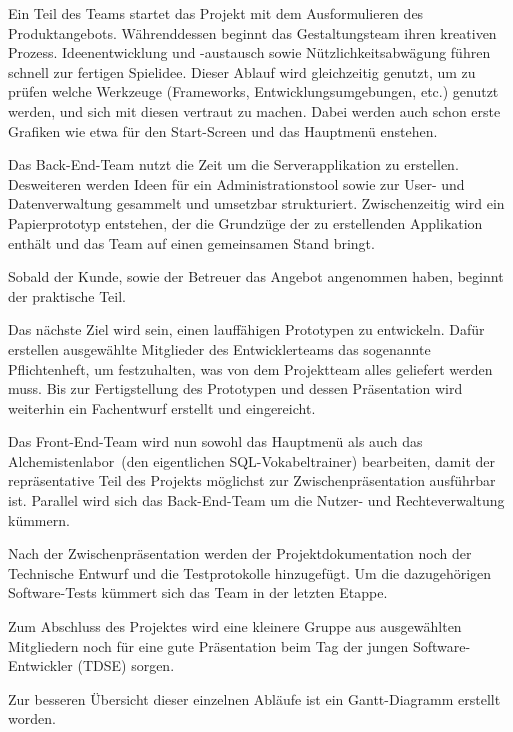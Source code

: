 Ein Teil des Teams startet das Projekt mit dem Ausformulieren des Produktangebots. W\"ahrenddessen beginnt das Gestaltungsteam ihren kreativen Prozess.
Ideenentwicklung und -austausch sowie N\"utzlichkeitsabw\"agung f\"uhren schnell zur fertigen Spielidee. Dieser Ablauf wird gleichzeitig genutzt, um zu pr\"ufen welche 
Werkzeuge (Frameworks, Entwicklungsumgebungen, etc.) genutzt werden, und sich mit diesen vertraut zu machen. Dabei werden auch schon erste Grafiken wie etwa 
f\"ur den Start-Screen und das Hauptmen\"u enstehen.

Das Back-End-Team nutzt die Zeit um die Serverapplikation zu erstellen. Desweiteren werden Ideen f\"ur ein Administrationstool sowie zur User- und Datenverwaltung 
gesammelt und umsetzbar strukturiert. Zwischenzeitig wird ein Papierprototyp entstehen, der die Grundz\"uge der zu erstellenden Applikation enth\"alt und das Team auf
einen gemeinsamen Stand bringt.

Sobald der Kunde, sowie der Betreuer das Angebot angenommen haben, beginnt der praktische Teil.

Das n\"achste Ziel wird sein, einen lauff\"ahigen Prototypen zu entwickeln.
Daf\"ur erstellen ausgew\"ahlte Mitglieder des Entwicklerteams das sogenannte Pflichtenheft, um festzuhalten, was von dem Projektteam alles geliefert werden muss.
Bis zur Fertigstellung des Prototypen und dessen Pr\"asentation wird weiterhin ein Fachentwurf erstellt und eingereicht.

Das Front-End-Team wird nun sowohl das Hauptmen\"u als auch das \glqq Alchemistenlabor\grqq~(den eigentlichen \glqq SQL-Vokabeltrainer\grqq) bearbeiten, damit der repr\"asentative 
Teil des Projekts m\"oglichst zur Zwischenpr\"asentation ausf\"uhrbar ist.
Parallel wird sich das Back-End-Team um die Nutzer- und Rechteverwaltung k\"ummern. 

Nach der Zwischenpr\"asentation werden der Projektdokumentation noch der Technische Entwurf und die Testprotokolle hinzugef\"ugt.
Um die dazugeh\"origen Software-Tests k\"ummert sich das Team in der letzten Etappe.

Zum Abschluss des Projektes wird eine kleinere Gruppe aus ausgew\"ahlten Mitgliedern noch f\"ur eine gute Pr\"asentation beim Tag der jungen Software-Entwickler 
(TDSE)  sorgen. 

Zur besseren \"Ubersicht dieser einzelnen Abl\"aufe ist ein Gantt-Diagramm erstellt worden.

